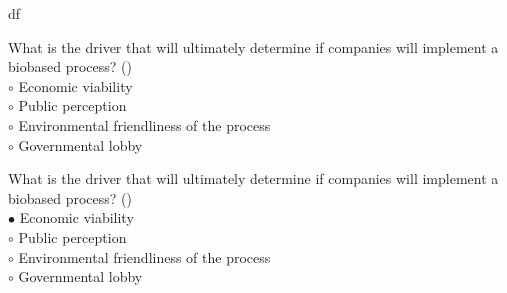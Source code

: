 df\documentclass[]{beamer}
\begin{document}
\begin{CJK}{UTF8}{gbsn}
\begin{frame}[shrink] {}
\addtocounter{questions}{1}
\color{blue}
What is the driver that will ultimately determine if companies will implement a biobased process?
({})\\
\color{black}
\setlength{\parindent}{-0.4cm}
{\color{red}$\circ$}  Economic viability   \\
{\color{red}$\circ$} Public perception  \\
{\color{red}$\circ$} Environmental friendliness of the process   \\
{\color{red}$\circ$} Governmental lobby  \\
\end{frame}
\begin{frame}[shrink] {}
\addtocounter{answers}{1}
\color{blue}
What is the driver that will ultimately determine if companies will implement a biobased process?
({})\\
\color{black}
\setlength{\parindent}{-0.4cm}
{\color{red}$\bullet$} Economic viability   \\
{\color{red}$\circ$} Public perception  \\
{\color{red}$\circ$} Environmental friendliness of the process   \\
{\color{red}$\circ$} Governmental lobby  \\
\end{frame}



\end{CJK}
\end{document}
